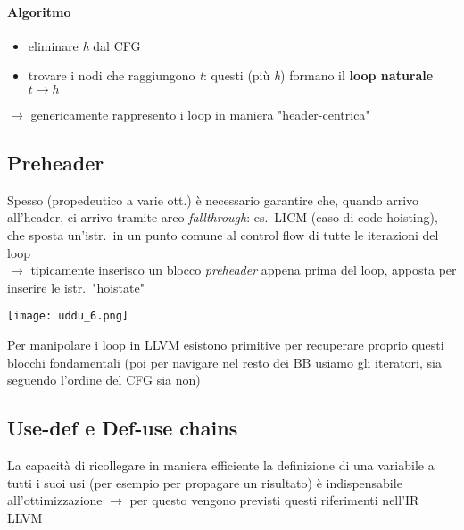 \paragraph{Algoritmo}
\begin{itemize}
  \item eliminare \textit{h} dal CFG
  \item trovare i nodi che raggiungono \textit{t}: questi (pi\`u \textit{h}) formano il \textbf{loop naturale} $t \rightarrow h$
\end{itemize}


$\rightarrow$ genericamente rappresento i loop in maniera "header-centrica"

\subsection{Preheader}

\noindent\begin{minipage}[c]{.65\textwidth}
  Spesso (propedeutico a varie ott.) \`e necessario garantire che, quando arrivo all'header, ci arrivo tramite arco \textit{fallthrough}: es.~LICM (caso di code hoisting), che sposta un'istr.~in un punto comune al control flow di tutte le iterazioni del loop\\
  $\rightarrow$ tipicamente inserisco un blocco \textit{preheader} appena prima del loop, apposta per inserire le istr.~"hoistate"
\end{minipage}\hfill
\begin{minipage}[c]{.3\textwidth}
  \texttt{[image: uddu\_6.png]}
\end{minipage}

\begin{emphasize}
  Per manipolare i loop in LLVM esistono primitive per recuperare proprio questi blocchi fondamentali (poi per navigare nel resto dei BB usiamo gli iteratori, sia seguendo l'ordine del CFG sia non)
\end{emphasize}

\subsection{Use-def e Def-use chains}

La capacit\`a di ricollegare in maniera efficiente la definizione di una variabile a tutti i suoi usi (per esempio per propagare un risultato) \`e indispensabile all'ottimizzazione $\rightarrow$ per questo vengono previsti questi riferimenti nell'IR LLVM

